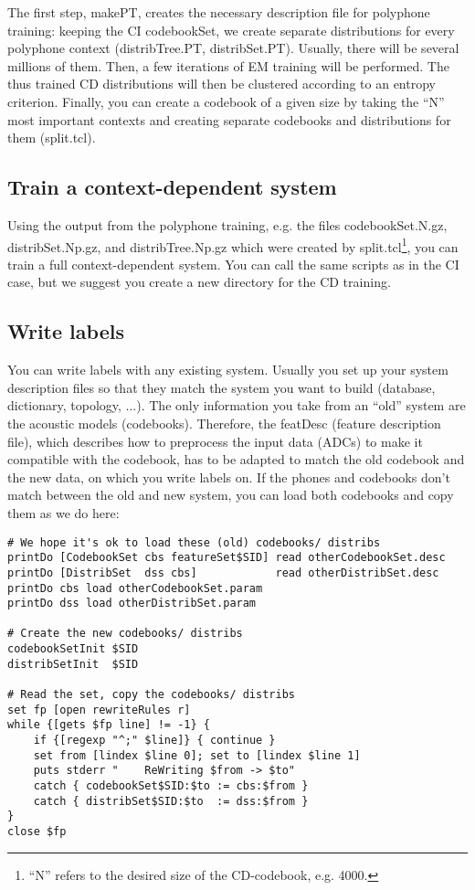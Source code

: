 The  first  step, makePT,  creates the necessary  description file for
polyphone training:  keeping the  CI codebookSet,  we  create separate
distributions     for   every   polyphone   context   (distribTree.PT,
distribSet.PT). Usually, there will be several millions of them. Then,
a few iterations of EM training will be performed. The thus trained CD
distributions   will   then  be   clustered according    to an entropy
criterion.  Finally, you  can  create a  codebook  of a given  size by
taking  the   ``N''  most important   contexts   and creating separate
codebooks and distributions for them (split.tcl).

\subsection{Train a context-dependent system} \label{janus:cd}

Using   the  output  from the polyphone    training,  e.g.  the  files
codebookSet.N.gz, distribSet.Np.gz,  and distribTree.Np.gz which  were
created by split.tcl\footnote{``N'' refers to  the desired size of the
CD-codebook, e.g.  4000.},  you can  train a   full  context-dependent
system.   You can call  the  same scripts as  in the  CI  case, but we
suggest you create a new directory for the CD training.

\subsection{Write labels} \label{janus:labels}

You can write labels with any existing system. Usually you set up your
system description  files so that  they match  the system you  want to
build (database, dictionary, topology,  ...). The only information you
take    from    an  ``old''   system     are    the  acoustic   models
(codebooks). Therefore, the featDesc (feature description file), which
describes   how to  preprocess   the  input data    (ADCs) to  make it
compatible with the   codebook, has to be  adapted  to match  the  old
codebook and the new data, on which you write labels on. If the phones
and codebooks don't match between the old and new system, you can load
both codebooks and copy them as we do here:

\begin{verbatim}
# We hope it's ok to load these (old) codebooks/ distribs
printDo [CodebookSet cbs featureSet$SID] read otherCodebookSet.desc
printDo [DistribSet  dss cbs]            read otherDistribSet.desc
printDo cbs load otherCodebookSet.param
printDo dss load otherDistribSet.param

# Create the new codebooks/ distribs
codebookSetInit $SID
distribSetInit  $SID

# Read the set, copy the codebooks/ distribs
set fp [open rewriteRules r]
while {[gets $fp line] != -1} {
    if {[regexp "^;" $line]} { continue }
    set from [lindex $line 0]; set to [lindex $line 1]
    puts stderr "    ReWriting $from -> $to"
    catch { codebookSet$SID:$to := cbs:$from }
    catch { distribSet$SID:$to  := dss:$from }
}
close $fp
\end{verbatim}

